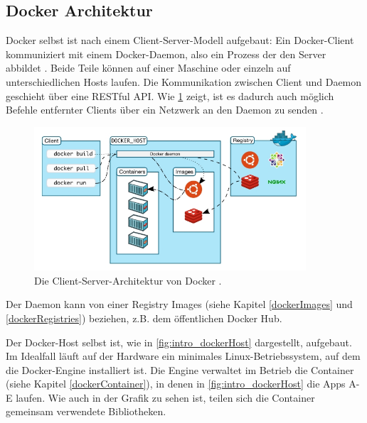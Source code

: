 \documentclass[../main.tex]{subfiles}
\begin{document}
		\subsection{Docker Architektur}
		\label{dockerArchitecture}
      Docker selbst ist nach einem Client-Server-Modell aufgebaut: Ein Docker-Client kommuniziert mit einem Docker-Daemon, also ein Prozess der den Server abbildet \cite{dockerUnderstandingDocker}. Beide Teile können auf einer Maschine oder einzeln auf unterschiedlichen Hosts laufen. Die Kommunikation zwischen Client und Daemon geschieht über eine \acrshort{REST}ful \acrshort{API}. Wie \fig \ref{fig:intro_dockerArchitecture} zeigt, ist es dadurch auch möglich Befehle entfernter Clients über ein Netzwerk an den Daemon zu senden \cite[S.3]{dockerSecIntro}.

      \begin{figure}[h]
          \centering
          \includegraphics[width=0.9\textwidth]{./images/intro_dockerArchitecture.jpg}
          \caption{Die Client-Server-Architektur von Docker \cite{dockerUnderstandingDocker}.}
          \label{fig:intro_dockerArchitecture}
      \end{figure}

      Der Daemon kann von einer Registry Images (siehe Kapitel \ref{dockerImages} und \ref{dockerRegistries}) beziehen, z.B. dem öffentlichen Docker Hub.

      Der Docker-Host selbst ist, wie in \fig \ref{fig:intro_dockerHost} dargestellt, aufgebaut. Im Idealfall läuft auf der Hardware ein minimales Linux-Betriebssystem, auf dem die Docker-Engine installiert ist. Die Engine verwaltet im Betrieb die Container (siehe Kapitel \ref{dockerContainer}), in denen in \fig \ref{fig:intro_dockerHost} die Apps A-E laufen. Wie auch in der Grafik zu sehen ist, teilen sich die Container gemeinsam verwendete Bibliotheken.%
\end{document}
